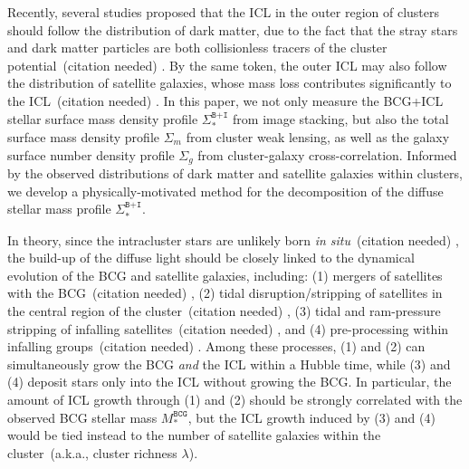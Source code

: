 \documentclass[fleqn,usenatbib]{mnras}
\newcommand{\sigbi}{\Sigma_*^{\texttt{B+I}}}
\newcommand{\sigm}{\Sigma_m}
\newcommand{\sigg}{\Sigma_g}
\newcommand{\msbcg}{M_*^{\texttt{BCG}}}
\newcommand\xkchen[1]{{\color{cyan} {#1}}}
\newcommand*\citeme{{\color{green}(citation needed)}}
\begin{document}
Recently, several studies proposed that the ICL in the outer region of
clusters should follow the distribution of dark matter, due to the fact
that the stray stars and dark matter particles are both collisionless
tracers of the cluster potential~\citeme \xkchen{\citep{Montes2019, AlonsoAsensio2020, Poliakov2021} }. By the same token, the outer ICL
may also follow the distribution of satellite galaxies, whose mass loss
contributes significantly to the ICL~\citeme \xkchen{\citep{Purcell2007, Martel2012, Contini2014, Morishita2017} }. In this paper, we not only
measure the BCG+ICL stellar surface mass density profile $\sigbi$ from
image stacking, but also the total surface mass density profile $\sigm$
from cluster weak lensing, as well as the galaxy surface number density
profile $\sigg$ from cluster-galaxy cross-correlation. Informed by the
observed distributions of dark matter and satellite galaxies within
clusters, we develop a physically-motivated method for the decomposition of
the diffuse stellar mass profile $\sigbi$.



In theory, since the intracluster stars are unlikely born {\it in
situ}~\citeme \xkchen{\citep{Melnick2012} }, the build-up of the diffuse light should be closely linked
to the dynamical evolution of the BCG and satellite galaxies, including:
(1) mergers of satellites with the BCG~\citeme \xkchen{\citep{Murante2007, Conroy2007, Burke2015} }, (2) tidal
disruption/stripping of satellites in the central region of the
cluster~\citeme \xkchen{\citep{Montes2014, DeMaio2015, Montes2018, DeMaio2018, Contini2018} }, (3) tidal and ram-pressure stripping of infalling
satellites~\citeme \xkchen{\citep{Rudick2009, Contini2014, Contini2019, JimenezTeja2018, JimenezTeja2019} }, and (4) pre-processing within infalling groups~\citeme \xkchen{\citep{Willman2004, Mihos2005, Rudick2006, Mihos2017, Han2018} }.
Among these processes, (1) and (2) can simultaneously grow the BCG {\it
and} the ICL within a Hubble time, while (3) and (4) deposit stars only
into the ICL without growing the BCG.  In particular, the amount of ICL
growth through (1) and (2) should be strongly correlated with the observed
BCG stellar mass $\msbcg$, but the ICL growth induced by (3) and (4) would
be tied instead to the number of satellite galaxies within the
cluster~(a.k.a., cluster richness $\lambda$).
\end{document}
